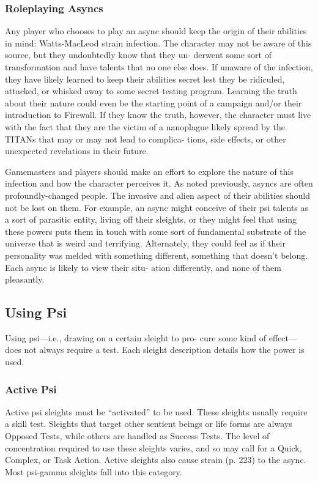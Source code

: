 \subsubsection{Roleplaying Asyncs}

Any player who chooses to play an async should keep 
the origin of their abilities in mind: Watts-MacLeod 
strain infection. The character may not be aware of 
this source, but they undoubtedly know that they un-
derwent some sort of transformation and have talents 
that no one else does. If unaware of the infection, they 
have likely learned to keep their abilities secret lest 
they be ridiculed, attacked, or whisked away to some 
secret testing program. Learning the truth about their 
nature could even be the starting point of a campaign 
and/or their introduction to Firewall. If they know the 
truth, however, the character must live with the fact 
that they are the victim of a nanoplague likely spread 
by the TITANs that may or may not lead to complica-
tions, side effects, or other unexpected revelations in 
their future.

Gamemasters and players should make an effort 
to explore the nature of this infection and how the 
character perceives it. As noted previously, asyncs are 
often profoundly-changed people. The invasive and 
alien aspect of their abilities should not be lost on 
them. For example, an async might conceive of their 
psi talents as a sort of parasitic entity, living off their 
sleights, or they might feel that using these powers 
puts them in touch with some sort of fundamental 
substrate of the universe that is weird and terrifying. 
Alternately, they could feel as if their personality was 
melded with something different, something that 
doesn't belong. Each async is likely to view their situ-
ation differently, and none of them pleasantly.

\subsection{Using Psi}

Using psi—i.e., drawing on a certain sleight to pro-
cure some kind of effect—does not always require a 
test. Each sleight description details how the power 
is used.

\subsubsection{Active Psi}

Active psi sleights must be ``activated'' to be used. 
These sleights usually require a skill test. Sleights that 
target other sentient beings or life forms are always 
Opposed Tests, while others are handled as Success 
Tests. The level of concentration required to use these 
sleights varies, and so may call for a Quick, Complex, 
or Task Action. Active sleights also cause strain (p. 
223) to the async. Most psi-gamma sleights fall into 
this category.

